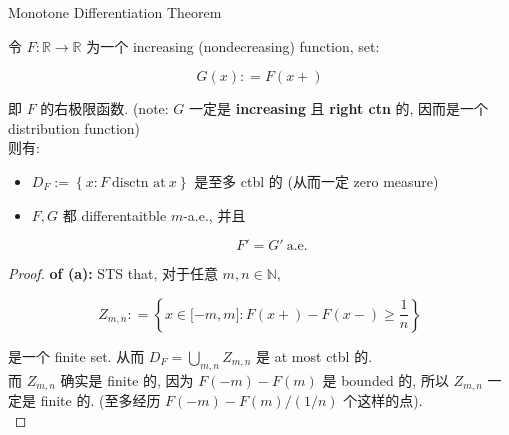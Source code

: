 \documentclass{qlnotes-export}
\begin{document}
\begin{theorem}{Monotone Differentiation Theorem}\label{thm-12-differentiation-on-real-spaces-monotone-differentiation-theorem}

令 \(F:{\mathbb{R}}\rightarrow{\mathbb{R}}\) 为一个 increasing (nondecreasing) function, set:

\[G(x): = F(x + )\]

即 \(F\) 的右极限函数. (note: \(G\) 一定是 \textbf{increasing} 且 \textbf{right ctn} 的, 因而是一个 distribution function)\\
则有:

\begin{itemize}
\item
  \(D_{F} := \left\{ {x:F\ \text{disctn at}\ x} \right\}\) 是至多 ctbl 的 (从而一定 zero measure)
\item
  \(F,G\) 都 differentaitble \(m\)-a.e., 并且

  \[F' = G'\ \text{a.e.}\]
\end{itemize}

\end{theorem}

\begin{proof}

\textbf{of (a):} STS that, 对于任意 \(m,n \in {\mathbb{N}}\),

\[Z_{m,n}: = \left\{ {x \in \lbrack - m,m\rbrack:F(x + ) - F(x - ) \geq \frac{1}{n}} \right\}\]

是一个 finite set. 从而 \(D_{F} = \bigcup_{m,n}Z_{m,n}\) 是 at most ctbl 的.\\
而 \(Z_{m,n}\) 确实是 finite 的, 因为 \(F( - m) - F(m)\) 是 bounded 的, 所以 \(Z_{m,n}\) 一定是 finite 的. (至多经历 \(F( - m) - F(m)/(1/n)\) 个这样的点).\\

\end{proof}
\end{document}
